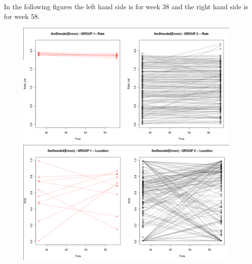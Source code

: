 \documentclass[12pt]{article}%
\begin{document}
In the following figures the left hand side is for week 38 and the right hand side is for week 58. 
\begin{figure}
\begin{center}
\includegraphics[scale=0.25]{v184_w38vsw58_Rate.png}
\includegraphics[scale=0.25]{v184_w38vsw58_Location.png}
\end{center}
\end{figure}
\end{document}
